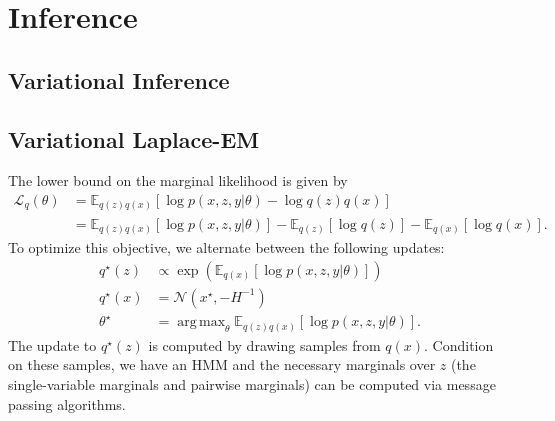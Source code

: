 \documentclass{article}
\DeclareMathOperator*{\argmax}{arg\,max}
\begin{document}
%

\section{Inference}

\subsection{Variational Inference}

\subsection{Variational Laplace-EM}

The lower bound on the marginal likelihood is given by
\begin{align*}
\mathcal{L}_q(\theta) & = \mathbb{E}_{q(z) q(x)}[\log p(x, z, y | \theta) - \log q(z) q(x)] \\
& = \mathbb{E}_{q(z) q(x)}[\log p(x, z, y | \theta)] - \mathbb{E}_{q(z)}[\log q(z)] - \mathbb{E}_{q(x)}[\log q(x)].
\end{align*}
To optimize this objective, we alternate between the following updates: 
\begin{align*}
q^\star(z) & \propto \exp ( \mathbb{E}_{q(x)}[\log p(x, z, y | \theta)] ) \\
q^\star(x) &  = \mathcal{N}(x^\star, -H^{-1}) \\
\theta^\star & = \argmax_\theta \mathbb{E}_{q(z) q(x)}[\log p(x, z, y | \theta)].
\end{align*}
The update to $q^\star(z)$ is computed by drawing samples from $q(x)$. Condition on these samples, we have an HMM and the necessary marginals over $z$ (the single-variable marginals and pairwise marginals) can be computed via message passing algorithms. 
\end{document}
